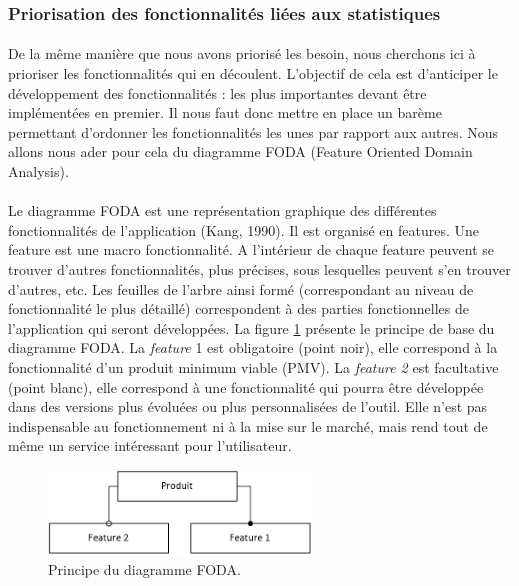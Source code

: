 		\subsubsection{Priorisation des fonctionnalités liées aux statistiques}
			\paragraph{}%
			De la même manière que nous avons priorisé les besoin, nous cherchons ici à
			prioriser les fonctionnalités qui en découlent. L'objectif de cela est
			d'anticiper le développement des fonctionnalités : les plus importantes
			devant être implémentées en premier. Il nous faut donc mettre en place un
			barème permettant d'ordonner les fonctionnalités les unes par rapport aux
			autres. Nous allons nous ader pour cela du diagramme FODA (Feature Oriented
			Domain Analysis).
			
			\paragraph{}%
			Le diagramme FODA est une représentation graphique des différentes
			fonctionnalités de l’application (Kang, 1990). Il est organisé en features.
			Une feature est une macro fonctionnalité. A l’intérieur de chaque feature
			peuvent se trouver d’autres fonctionnalités, plus précises, sous lesquelles
			peuvent s’en trouver d’autres, etc. Les feuilles de l’arbre ainsi formé
			(correspondant au niveau de fonctionnalité le plus détaillé) correspondent à
			des parties fonctionnelles de l’application qui seront développées.\newline
			La figure \ref{foda_legende} présente le principe de base du diagramme FODA.
			La \textit{feature} 1 est obligatoire (point noir), elle correspond à la
			fonctionnalité d'un produit minimum viable (PMV). La \textit{feature 2} est
			facultative (point blanc), elle correspond à une fonctionnalité qui pourra être
			développée dans des versions plus évoluées ou plus personnalisées de
			l’outil. Elle n’est pas indispensable au fonctionnement ni à la mise sur le
			marché, mais rend tout de même un service intéressant pour l'utilisateur.
			\begin{figure}[H]%
				\centering
				\includegraphics[width=7cm]{../img/foda_legende.png}
				\caption{\label{foda_legende} Principe du diagramme FODA.}
			\end{figure}
			
